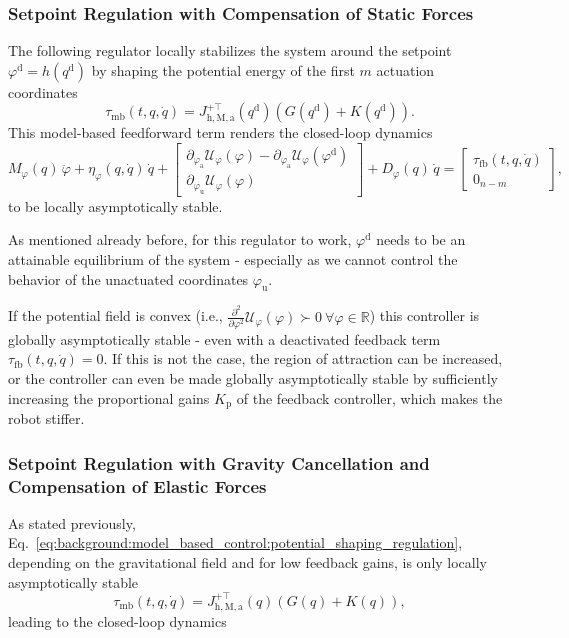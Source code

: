 \subsubsection{Setpoint Regulation with Compensation of Static Forces}
The following regulator locally stabilizes the system around the setpoint $\varphi^\mathrm{d} = h(q^\mathrm{d})$ by shaping the potential energy of the first $m$ actuation coordinates~\citep{borja2022energy, della2023model}
\begin{equation}\label{eq:background:model_based_control:potential_shaping_regulation}
    \tau_\mathrm{mb}(t, q, \dot{q}) = J_{\mathrm{h},\mathrm{M},\mathrm{a}}^{+\top}(q^\mathrm{d}) \left ( G(q^\mathrm{d}) + K(q^\mathrm{d}) \right ).
\end{equation}
This model-based feedforward term renders the closed-loop dynamics
\begin{equation}
    M_\varphi(q) \, \ddot{\varphi} + \eta_\varphi(q,\dot{q}) \, \dot{q} + \begin{bmatrix}
        \partial_{\varphi_\mathrm{a}} \mathcal{U}_\varphi(\varphi) - \partial_{\varphi_\mathrm{a}} \mathcal{U}_\varphi(\varphi^\mathrm{d})\\
        \partial_{\varphi_\mathrm{u}} \mathcal{U}_\varphi(\varphi)
    \end{bmatrix} + D_\varphi(q) \, \dot{q} = \begin{bmatrix}
        \tau_\mathrm{fb}(t, q, \dot{q})\\ 0_{n-m}
    \end{bmatrix},
\end{equation}
to be locally asymptotically stable.

As mentioned already before, for this regulator to work, $\varphi^\mathrm{d}$ needs to be an attainable equilibrium of the system - especially as we cannot control the behavior of the unactuated coordinates $\varphi_\mathrm{u}$. 

If the potential field is convex (i.e., $\frac{\partial^2}{\partial \varphi^2}  \mathcal{U}_\varphi(\varphi) \succ 0 \: \forall \varphi \in \mathbb{R}$) this controller is globally asymptotically stable - even with a deactivated feedback term $\tau_\mathrm{fb}(t,q,\dot{q})=0$. If this is not the case, the region of attraction can be increased, or the controller can even be made globally asymptotically stable by sufficiently increasing the proportional gains $K_\mathrm{p}$ of the feedback controller, which makes the robot stiffer.

\subsubsection{Setpoint Regulation with Gravity Cancellation and Compensation of Elastic Forces}
As stated previously, Eq.~\ref{eq:background:model_based_control:potential_shaping_regulation}, depending on the gravitational field and for low feedback gains, is only locally asymptotically stable 
\begin{equation}
    \tau_\mathrm{mb}(t, q, \dot{q}) =  J_{\mathrm{h},\mathrm{M},\mathrm{a}}^{+\top}(q) \left ( G(q) + K(q) \right ),
\end{equation}
leading to the closed-loop dynamics

